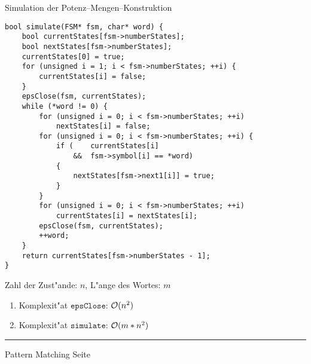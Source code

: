 \begin{slide}{}
\normalsize

\begin{center}
Simulation der Potenz--Mengen--Konstruktion
\end{center}
\vspace*{0.5cm}

\footnotesize
\begin{verbatim}
bool simulate(FSM* fsm, char* word) {
    bool currentStates[fsm->numberStates];
    bool nextStates[fsm->numberStates];
    currentStates[0] = true;
    for (unsigned i = 1; i < fsm->numberStates; ++i) {
        currentStates[i] = false;
    }
    epsClose(fsm, currentStates);
    while (*word != 0) {
        for (unsigned i = 0; i < fsm->numberStates; ++i)
            nextStates[i] = false;
        for (unsigned i = 0; i < fsm->numberStates; ++i) {
            if (    currentStates[i]         
                &&  fsm->symbol[i] == *word) 
            {
                nextStates[fsm->next1[i]] = true;
            }
        }
        for (unsigned i = 0; i < fsm->numberStates; ++i)
            currentStates[i] = nextStates[i];
        epsClose(fsm, currentStates);
        ++word;
    }
    return currentStates[fsm->numberStates - 1];
}
\end{verbatim}
Zahl der Zust"ande: $n$, L"ange des Wortes: $m$
\begin{enumerate}
\item Komplexit"at $\texttt{epsClose}$: $\mathcal{O}(n^2)$
\item Komplexit"at $\mathtt{simulate}$: $\mathcal{O}(m*n^2)$
\end{enumerate}

\vspace*{\fill}
\tiny \addtocounter{mypage}{1}
\rule{17cm}{1mm}
Pattern Matching \hspace*{\fill} Seite 
\end{slide}


